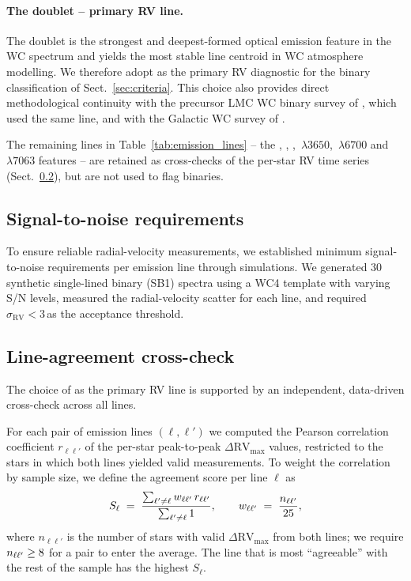 \paragraph{The \primaryline doublet -- primary RV line.}
The \primaryline doublet is the strongest and deepest-formed optical
emission feature in the WC spectrum and yields the most stable line
centroid in WC atmosphere modelling. We therefore adopt \primaryline
as the primary RV diagnostic for the binary classification of
Sect.~\ref{sec:criteria}. This choice also provides direct
methodological continuity with the precursor LMC WC binary survey of
\citet{Bartzakos2001}, which used the same line, and with the Galactic
WC survey of \citet{Dsilva2020,Dsilva2023}.

The remaining lines in Table~\ref{tab:emission_lines} -- the
, , , \,$\lambda 3650$,
\,$\lambda 6700$ and \,$\lambda 7063$ features
-- are retained as cross-checks of the per-star RV time series
(Sect.~\ref{sec:line_agreement}), but are not used to flag binaries.

\subsection{Signal-to-noise requirements}
\label{sec:snr}

To ensure reliable radial-velocity measurements, we established minimum
signal-to-noise requirements per emission line through simulations. We
generated 30 synthetic single-lined binary (SB1) spectra using a WC4
template with varying S/N levels, measured the radial-velocity scatter for
each line, and required $\sigma_\mathrm{RV} < 3$\,\kms as the acceptance
threshold.

\subsection{Line-agreement cross-check}
\label{sec:line_agreement}

The choice of \primaryline as the primary RV line is supported by an
independent, data-driven cross-check across all \NlinesAll lines.

For each pair of emission lines $(\ell, \ell')$ we computed the Pearson
correlation coefficient $r_{\ell\ell'}$ of the per-star peak-to-peak
$\Delta\mathrm{RV}_{\max}$ values, restricted to the stars in which both
lines yielded valid measurements. To weight the correlation by sample
size, we define the agreement score per line $\ell$ as
\begin{equation}
S_\ell \;=\; \frac{\sum_{\ell' \neq \ell}
                    w_{\ell\ell'}\,r_{\ell\ell'}}
                  {\sum_{\ell' \neq \ell} 1},
\qquad
w_{\ell\ell'} \;=\; \frac{n_{\ell\ell'}}{25},
\label{eq:agreement_score}
\end{equation}
where $n_{\ell\ell'}$ is the number of stars with valid
$\Delta\mathrm{RV}_{\max}$ from both lines; we require
$n_{\ell\ell'} \geq 8$ for a pair to enter the average.
The line that is most ``agreeable'' with the rest of the sample has
the highest $S_\ell$.

